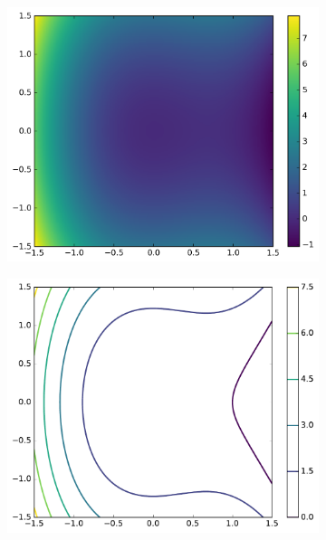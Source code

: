 \begin{figure}[H] %
\centering
\begin{subfigure}{.495\textwidth}
    \centering
    \includegraphics[width=\linewidth]{figures/heatmap_1.pdf}
\end{subfigure}
%
\begin{subfigure}{.495\textwidth}
    \centering
    \includegraphics[width=\linewidth]{figures/contour_1.pdf}
\end{subfigure}
\\
\begin{subfigure}{.495\textwidth}

\end{subfigure}
\end{figure}
